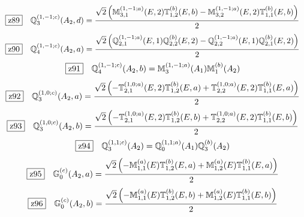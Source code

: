 \documentclass[fleqn,10pt,landscape]{jsarticle}
\begin{document}
\begin{dmath*}
\hspace*{3mm}\fbox{z89}\quad \mathbb{Q}_{3}^{(1,-1;c)}(A_{2},d)=\frac{\sqrt{2} \left(\mathbb{M}_{3,1}^{(1,-1;a)}(E,2) \mathbb{T}_{1,2}^{(b)}(E,b) - \mathbb{M}_{3,2}^{(1,-1;a)}(E,2) \mathbb{T}_{1,1}^{(b)}(E,b)\right)}{2}
\end{dmath*}
\begin{dmath*}
\hspace*{3mm}\fbox{z90}\quad \mathbb{Q}_{4}^{(1,-1;c)}(A_{2},a)=\frac{\sqrt{2} \left(\mathbb{Q}_{2,1}^{(1,-1;a)}(E,1) \mathbb{Q}_{2,2}^{(b)}(E,2) - \mathbb{Q}_{2,2}^{(1,-1;a)}(E,1) \mathbb{Q}_{2,1}^{(b)}(E,2)\right)}{2}
\end{dmath*}
\begin{dmath*}
\hspace*{3mm}\fbox{z91}\quad \mathbb{Q}_{4}^{(1,-1;c)}(A_{2},b)=\mathbb{M}_{3}^{(1,-1;a)}(A_{1}) \mathbb{M}_{1}^{(b)}(A_{2})
\end{dmath*}
\begin{dmath*}
\hspace*{3mm}\fbox{z92}\quad \mathbb{Q}_{3}^{(1,0;c)}(A_{2},a)=\frac{\sqrt{2} \left(- \mathbb{T}_{2,1}^{(1,0;a)}(E,2) \mathbb{T}_{1,2}^{(b)}(E,a) + \mathbb{T}_{2,2}^{(1,0;a)}(E,2) \mathbb{T}_{1,1}^{(b)}(E,a)\right)}{2}
\end{dmath*}
\begin{dmath*}
\hspace*{3mm}\fbox{z93}\quad \mathbb{Q}_{3}^{(1,0;c)}(A_{2},b)=\frac{\sqrt{2} \left(- \mathbb{T}_{2,1}^{(1,0;a)}(E,2) \mathbb{T}_{1,2}^{(b)}(E,b) + \mathbb{T}_{2,2}^{(1,0;a)}(E,2) \mathbb{T}_{1,1}^{(b)}(E,b)\right)}{2}
\end{dmath*}
\begin{dmath*}
\hspace*{3mm}\fbox{z94}\quad \mathbb{Q}_{3}^{(1,1;c)}(A_{2})=\mathbb{Q}_{0}^{(1,1;a)}(A_{1}) \mathbb{Q}_{3}^{(b)}(A_{2})
\end{dmath*}
\begin{dmath*}
\hspace*{3mm}\fbox{z95}\quad \mathbb{G}_{0}^{(c)}(A_{2},a)=\frac{\sqrt{2} \left(- \mathbb{M}_{1,1}^{(a)}(E) \mathbb{T}_{1,2}^{(b)}(E,a) + \mathbb{M}_{1,2}^{(a)}(E) \mathbb{T}_{1,1}^{(b)}(E,a)\right)}{2}
\end{dmath*}
\begin{dmath*}
\hspace*{3mm}\fbox{z96}\quad \mathbb{G}_{0}^{(c)}(A_{2},b)=\frac{\sqrt{2} \left(- \mathbb{M}_{1,1}^{(a)}(E) \mathbb{T}_{1,2}^{(b)}(E,b) + \mathbb{M}_{1,2}^{(a)}(E) \mathbb{T}_{1,1}^{(b)}(E,b)\right)}{2}
\end{dmath*}
\end{document}
